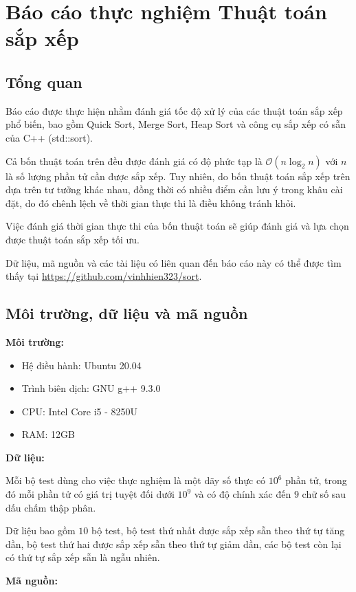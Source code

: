 \documentclass[12pt]{report}
\begin{document}
	\section*{Báo cáo thực nghiệm Thuật toán sắp xếp}
	\subsection*{Tổng quan}
	Báo cáo được thực hiện nhằm đánh giá tốc độ xử lý của các thuật toán sắp xếp phổ biến, bao gồm Quick Sort, Merge Sort, Heap Sort và công cụ sắp xếp có sẵn của C++ (std::sort).
	
	Cả bốn thuật toán trên đều được đánh giá có độ phức tạp là $\mathcal{O}(n\log_2 n)$ với $n$ là số lượng phần tử cần được sắp xếp. Tuy nhiên, do bốn thuật toán sắp xếp trên dựa trên tư tưởng khác nhau, đồng thời có nhiều điểm cần lưu ý trong khâu cài đặt, do đó chênh lệch về thời gian thực thi là điều không tránh khỏi.
	
	Việc đánh giá thời gian thực thi của bốn thuật toán sẽ giúp đánh giá và lựa chọn được thuật toán sắp xếp tối ưu.
	
	Dữ liệu, mã nguồn và các tài liệu có liên quan đến báo cáo này có thể được tìm thấy tại \url{https://github.com/vinhhien323/sort}.
	
	\subsection*{Môi trường, dữ liệu và mã nguồn}
	
	\textbf{Môi trường:}
	
	\begin{itemize}
		\item Hệ điều hành: Ubuntu 20.04
		\item Trình biên dịch: GNU g++ 9.3.0
		\item CPU: Intel Core i5 - 8250U
		\item RAM: 12GB
	\end{itemize}
	
	\textbf{Dữ liệu:}
	
	Mỗi bộ test dùng cho việc thực nghiệm là một dãy số thực có $10^6$ phần tử, trong đó mỗi phần tử có giá trị tuyệt đối dưới $10^9$ và có độ chính xác đến $9$ chữ số sau dấu chấm thập phân.
	
	Dữ liệu bao gồm $10$ bộ test, bộ test thứ nhất được sắp xếp sẵn theo thứ tự tăng dần, bộ test thứ hai được sắp xếp sẵn theo thứ tự giảm dần, các bộ test còn lại có thứ tự sắp xếp sẵn là ngẫu nhiên.
	
	\textbf{Mã nguồn:}
	
\end{document}

